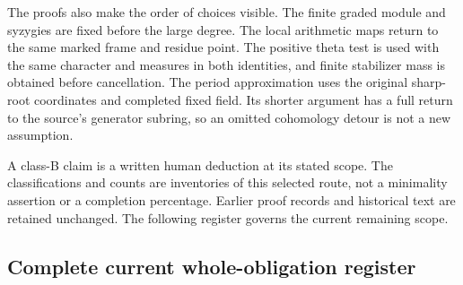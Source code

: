 The proofs also make the order of choices visible. The finite graded
module and syzygies are fixed before the large degree. The local
arithmetic maps return to the same marked frame and residue point.
The positive theta test is used with the same character and measures
in both identities, and finite stabilizer mass is obtained before
cancellation. The period approximation uses the original sharp-root
coordinates and completed fixed field. Its shorter argument has a
full return to the source's generator subring, so an omitted
cohomology detour is not a new assumption.

A class-B claim is a written human deduction at its stated scope.
The classifications and counts are inventories of this selected route,
not a minimality assertion or a completion percentage. Earlier proof
records and historical text are retained unchanged. The following
register governs the current remaining scope.

\subsection{Complete current whole-obligation register}

